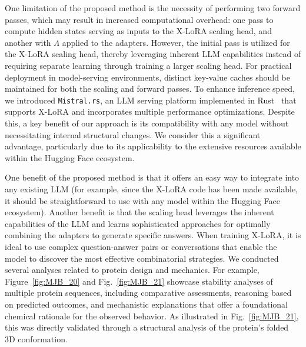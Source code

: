 One limitation of the proposed method is the necessity of performing two forward passes, which may result in increased computational overhead: one pass to compute hidden states serving as inputs to the X-LoRA scaling head, and another with $\Lambda$ applied to the adapters. However, the initial pass is utilized for the X-LoRA scaling head, thereby leveraging inherent LLM capabilities instead of requiring separate learning through training a larger scaling head. For practical deployment in model-serving environments, distinct key-value caches should be maintained for both the scaling and forward passes. To enhance inference speed, we introduced \texttt{Mistral.rs}, an LLM serving platform implemented in Rust~\cite{matsakis2014rust} that supports X-LoRA and incorporates multiple performance optimizations. Despite this, a key benefit of our approach is its compatibility with any model without necessitating internal structural changes. We consider this a significant advantage, particularly due to its applicability to the extensive resources available within the Hugging Face ecosystem.

One benefit of the proposed method is that it offers an easy way to integrate into any existing LLM (for example, since the X-LoRA code has been made available, it should be straightforward to use with any model within the Hugging Face ecosystem). Another benefit is that the scaling head leverages the inherent capabilities of the LLM and learns sophisticated approaches for optimally combining the adapters to generate specific answers. When training X-LoRA, it is ideal to use complex question-answer pairs or conversations that enable the model to discover the most effective combinatorial strategies. We conducted several analyses related to protein design and mechanics. For example, Figure~\ref{fig:MJB_20} and Fig.~\ref{fig:MJB_21} showcase stability analyses of multiple protein sequences, including comparative assessments, reasoning based on predicted outcomes, and mechanistic explanations that offer a foundational chemical rationale for the observed behavior. As illustrated in Fig.~\ref{fig:MJB_21}, this was directly validated through a structural analysis of the protein's folded 3D conformation.

